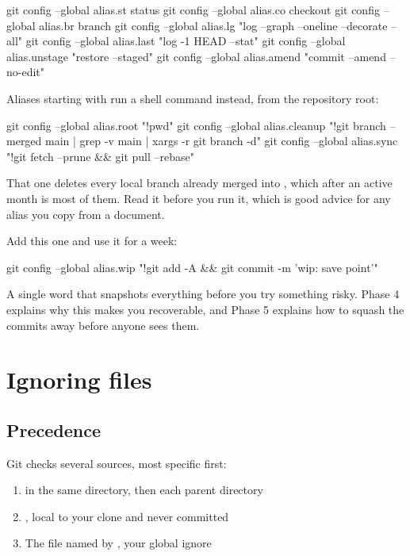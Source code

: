 \documentclass[11pt]{article}
\begin{document}
\begin{shell}
git config --global alias.st status
git config --global alias.co checkout
git config --global alias.br branch
git config --global alias.lg "log --graph --oneline --decorate --all"
git config --global alias.last "log -1 HEAD --stat"
git config --global alias.unstage "restore --staged"
git config --global alias.amend "commit --amend --no-edit"
\end{shell}

Aliases starting with \co{!} run a shell command instead, from the repository root:

\begin{shell}
git config --global alias.root "!pwd"
git config --global alias.cleanup "!git branch --merged main | grep -v main | xargs -r git branch -d"
git config --global alias.sync "!git fetch --prune && git pull --rebase"
\end{shell}

That  one deletes every local branch already merged into ,
which after an active month is most of them. Read it before you run it, which is
good advice for any alias you copy from a document.

\begin{tryit}
Add this one and use it for a week:

\begin{shell}
git config --global alias.wip "!git add -A && git commit -m 'wip: save point'"
\end{shell}

A single word that snapshots everything before you try something risky. Phase 4
explains why this makes you recoverable, and Phase 5 explains how to squash the
 commits away before anyone sees them.
\end{tryit}

\section{Ignoring files}

\subsection{Precedence}

Git checks several sources, most specific first:

\begin{enumerate}
  \item {} in the same directory, then each parent directory
  \item {}, local to your clone and never committed
  \item The file named by , your global ignore
\end{enumerate}
\end{document}
